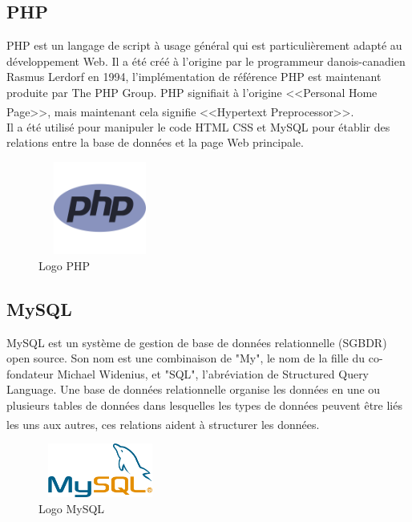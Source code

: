 \documentclass[12pt]{report}
\begin{document}
\vspace*{-0.3in}

\subsection{PHP}

PHP est un langage de script à usage général qui est particulièrement adapté au développement Web. Il a été créé à l'origine par le programmeur danois-canadien Rasmus Lerdorf en 1994, l'implémentation de référence PHP est maintenant produite par The PHP Group. PHP signifiait à l'origine <<Personal Home Page>>, mais maintenant cela signifie <<Hypertext Preprocessor>>.\textsuperscript{\cite{prettyman2016learn}\cite{supaartagorn2011php}\cite{converse2004php5}}
\\
Il a été utilisé pour manipuler le code HTML CSS et MySQL pour établir des relations entre la base de données et la page Web principale.

\vspace{-0.1in}

\begin{figure}[h]
\centering
    \includegraphics[width = 1.6in, height = 1.2in]{../Images/PHP.png}
\vspace{-0.3in}
\caption{Logo PHP}
\end{figure}

\newpage

\subsection{MySQL}

MySQL est un système de gestion de base de données relationnelle (SGBDR) open source. Son nom est une combinaison de "My", le nom de la fille du co-fondateur Michael Widenius, et "SQL", l'abréviation de Structured Query Language. Une base de données relationnelle organise les données en une ou plusieurs tables de données dans lesquelles les types de données peuvent être liés les uns aux autres, ces relations aident à structurer les données.\textsuperscript{\cite{converse2004php5}}

\begin{figure}[h]
\centering
    \includegraphics[width = 1.6in, height = 0.7in]{../Images/MySQL.png}
\vspace{0.1in}
\caption{Logo MySQL}
\end{figure}
\end{document}
